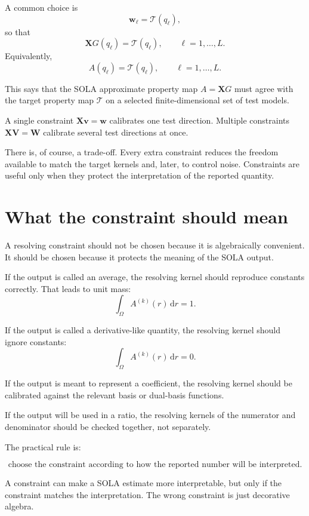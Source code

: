 \documentclass[11pt,openany]{book}
\theoremstyle{definition}
\theoremstyle{remark}
\newcommand{\Tau}{\mathcal{T}}
\newcommand{\dd}{\,\mathrm d}
\begin{document}
A common choice is
\[
  \mathbf w_\ell=\Tau(q_\ell),
\]
so that
\[
  \mathbf XG(q_\ell)=\Tau(q_\ell),
  \qquad \ell=1,\dots,L.
\]
Equivalently,
\[
  A(q_\ell)=\Tau(q_\ell),
  \qquad \ell=1,\dots,L.
\]

This says that the SOLA approximate property map \(A=\mathbf XG\) must agree with the target
property map \(\Tau\) on a selected finite-dimensional set of test models.

\begin{checkpointbox}
A single constraint \(\mathbf X\mathbf v=\mathbf w\) calibrates one test direction. Multiple
constraints \(\mathbf X\mathbf V=\mathbf W\) calibrate several test directions at once.
\end{checkpointbox}

There is, of course, a trade-off. Every extra constraint reduces the freedom available to match
the target kernels and, later, to control noise. Constraints are useful only when they protect the
interpretation of the reported quantity.

\section{What the constraint should mean}

A resolving constraint should not be chosen because it is algebraically convenient. It should be
chosen because it protects the meaning of the SOLA output.

If the output is called an average, the resolving kernel should reproduce constants correctly.
That leads to unit mass:
\[
  \int_\Omega A^{(k)}(r)\dd r=1.
\]

If the output is called a derivative-like quantity, the resolving kernel should ignore constants:
\[
  \int_\Omega A^{(k)}(r)\dd r=0.
\]

If the output is meant to represent a coefficient, the resolving kernel should be calibrated
against the relevant basis or dual-basis functions.

If the output will be used in a ratio, the resolving kernels of the numerator and denominator
should be checked together, not separately.

The practical rule is:

\[
  \text{choose the constraint according to how the reported number will be interpreted.}
\]

\begin{warningbox}
A constraint can make a SOLA estimate more interpretable, but only if the constraint matches
the interpretation. The wrong constraint is just decorative algebra.
\end{warningbox}
\end{document}
